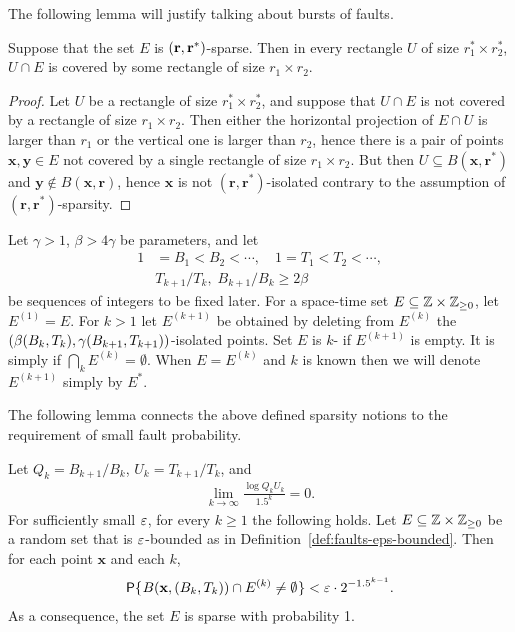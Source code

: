 \documentclass[11pt]{memoir}
\theoremstyle{definition} %
\renewcommand{\ge}{\geq}
\renewcommand{\vek}[1]{\mathbf{#1}}
\def\B{B}
\def\U{U}
\newcommand{\Q}{Q} %
\newcommand{\Tu}{T}
\renewcommand{\r}{\vek{r}} %
\newcommand{\x}{\vek{x}} %
\newcommand{\y}{\vek{y}} %
\begin{document}
The following lemma will justify talking about bursts of faults.

\begin{lemma}\label{lem:bursts}
  Suppose that the set \( E \) is \( \pair{\r}{\r^{*}} \)-sparse.
  Then in every rectangle \( U \) of size \( r^{*}_{1}\times r^{*}_{2} \), 
\( U\cap E \) is covered by some rectangle of size \( r_{1}\times r_{2} \).
\end{lemma}
\begin{proof}
  Let \( U \) be a rectangle of size \( r^{*}_{1}\times r^{*}_{2} \), and suppose that \( U\cap E \) is not
  covered by a rectangle of size \( r_{1}\times r_{2} \).
  Then either the horizontal projection of \( E\cap U \) is larger than \( r_{1} \) or the vertical one
  is larger than \( r_{2} \), hence there is a pair of points \( \x,\y\in E \) not covered by a single
  rectangle of size \( r_{1}\times r_{2} \).
  But then \( U\subseteq B(\x,\r^{*}) \) and \( \y\not\in B(\x,\r) \), hence \( \x \)
  is not \( (\r,\r^{*}) \)-isolated contrary to the assumption of \( (\r,\r^{*}) \)-sparsity.
\end{proof}

\begin{definition}\label{def:sparsity}
  Let \( \gamma> 1 \), \( \beta> 4\gamma \) be parameters, and let
  \begin{align*}
  1 &=\B_{1}<\B_{2}<\dotsm,\quad
  1=\Tu_{1}<\Tu_{2}<\dotsm,
\\ &\Tu_{k+1}/\Tu_{k},\; \B_{k+1}/\B_{k}\ge 2\beta
\end{align*}
be sequences of integers to be fixed later.
For a space-time set \( E\subseteq\bbZ\times\bbZ_{\ge 0} \), let \( E^{(1)} = E \).
For \( k>1 \) let \( E^{(k+1)} \) be obtained by deleting from \( E^{(k)} \) the
\( \pair{\beta\pair{\B_{k}}{\Tu_{k}}}{\gamma\pair{\B_{k+1}}{\Tu_{k+1}}} \)-isolated points.
Set \( E \) is \( k \)- if \( E^{(k+1)} \) is empty.
It is simply  if \( \bigcap_{k}E^{(k)}=\emptyset \).
When \( E=E^{(k)} \) and \( k \) is known
then we will denote \( E^{(k+1)} \) simply by \( E^{*} \).
\end{definition}

The following lemma connects the above defined sparsity notions to the requirement
of small fault probability.

\begin{lemma}[Sparsity]\label{lem:sparsity}
Let \( \Q_{k} = \B_{k+1}/\B_{k} \),  \( \U_{k} = \Tu_{k+1}/\Tu_{k} \), and
\begin{align}\label{eq:growth-assumption}
  \lim_{k\rightarrow\infty}\frac{\log \Q_{k}\U_{k}}{1.5^k}=0.
\end{align}
For sufficiently small \( \varepsilon \), for every \( k\ge 1 \) the following holds.
Let \( E\subseteq \bbZ\times\bbZ_{\ge 0} \) 
be a random set that is \( \varepsilon \)-bounded as in Definition~\ref{def:faults-eps-bounded}.
Then for each point \( \x \)  and each \( k \),
 \begin{align*}
   \Pbof{B(\x,\pair{\B_{k}}{\Tu_{k}})\cap E^{(k)}\neq\emptyset} < \eps \cdot 2^{-1.5^{k-1}}.
 \end{align*}
As a consequence, the set \( E \) is sparse with probability 1.
\end{lemma}
\end{document}
